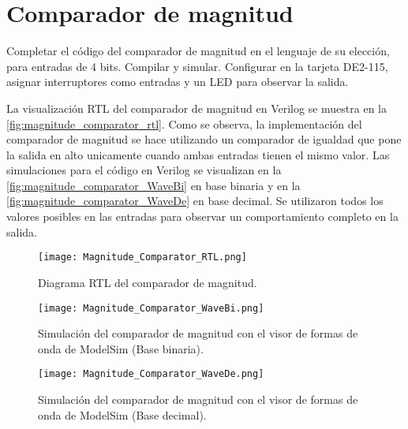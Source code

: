 \section{Comparador de magnitud \label{sec:s2}}

\begin{center}
	\begin{minipage}{12cm}
		\begin{tcolorbox}[title=Actividad 2]
			Completar el código del comparador de magnitud en el lenguaje de su elección, para entradas de 4 bits. Compilar y simular. Configurar en la tarjeta DE2-115, asignar interruptores como entradas y un LED para observar la salida.
		\end{tcolorbox}	
	\end{minipage}
\end{center}

La visualización RTL del comparador de magnitud en Verilog se muestra en la \autoref{fig:magnitude_comparator_rtl}. Como se observa, la implementación del comparador de magnitud se hace utilizando un comparador de igualdad que pone la salida en alto unicamente cuando ambas entradas tienen el mismo valor. Las simulaciones para el código en Verilog se visualizan en la \autoref{fig:magnitude_comparator_WaveBi} en base binaria y en la \autoref{fig:magnitude_comparator_WaveDe} en base decimal. Se utilizaron todos los valores posibles en las entradas para observar un comportamiento completo en la salida.

\begin{figure}[ht]
	\centering
	\texttt{[image: Magnitude\_Comparator\_RTL.png]}
	\caption{Diagrama RTL del comparador de magnitud. \label{fig:magnitude_comparator_rtl}}
\end{figure}

\begin{figure}[ht]
	\centering
	\texttt{[image: Magnitude\_Comparator\_WaveBi.png]}
	\caption{Simulación del comparador de magnitud con el visor de formas de onda de ModelSim (Base binaria). \label{fig:magnitude_comparator_WaveBi}}
\end{figure}

\begin{figure}[ht]
	\centering
	\texttt{[image: Magnitude\_Comparator\_WaveDe.png]}
	\caption{Simulación del comparador de magnitud con el visor de formas de onda de ModelSim (Base decimal). \label{fig:magnitude_comparator_WaveDe}}
\end{figure}





